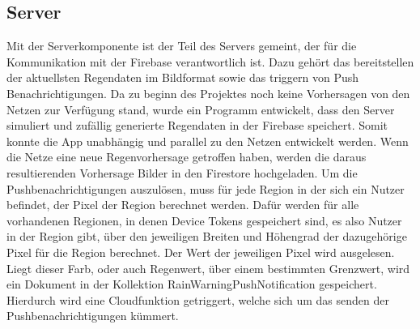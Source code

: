 \subsection{Server}\label{server}
Mit der Serverkomponente ist der Teil des Servers gemeint, der für die Kommunikation mit der Firebase verantwortlich ist. Dazu gehört das bereitstellen der aktuellsten Regendaten im Bildformat sowie das triggern von Push Benachrichtigungen. 
Da zu beginn des Projektes noch keine Vorhersagen von den Netzen zur Verfügung stand, wurde ein Programm entwickelt, dass den Server simuliert und zufällig generierte Regendaten in der Firebase speichert. Somit konnte die App unabhängig und parallel zu den Netzen entwickelt werden.
Wenn die Netze eine neue Regenvorhersage getroffen haben, werden die daraus resultierenden Vorhersage Bilder in den Firestore hochgeladen. 
Um die Pushbenachrichtigungen auszulösen, muss für jede Region in der sich ein Nutzer befindet, der Pixel der Region berechnet werden. 
Dafür werden für alle vorhandenen Regionen, in denen Device Tokens gespeichert sind, es also Nutzer in der Region gibt, über den jeweiligen Breiten und Höhengrad der dazugehörige Pixel für die Region berechnet. Der Wert der jeweiligen Pixel wird ausgelesen. Liegt dieser Farb, oder auch Regenwert, über einem bestimmten Grenzwert, wird ein Dokument in der Kollektion RainWarningPushNotification gespeichert. Hierdurch wird eine Cloudfunktion getriggert, welche sich um das senden der Pushbenachrichtigungen kümmert. 